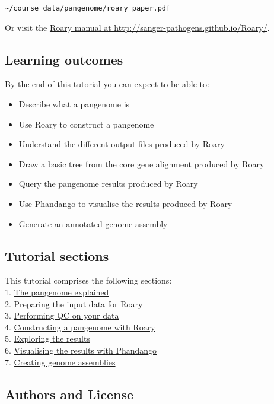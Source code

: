 \documentclass[11pt]{article}
\providecommand{\tightlist}{%
      \setlength{\itemsep}{0pt}\setlength{\parskip}{0pt}}
\begin{document}
\texttt{\textasciitilde{}/course\_data/pangenome/roary\_paper.pdf}

Or visit the \href{http://sanger-pathogens.github.io/Roary/}{Roary
manual at http://sanger-pathogens.github.io/Roary/}.

\hypertarget{learning-outcomes}{%
\subsection{Learning outcomes}\label{learning-outcomes}}

By the end of this tutorial you can expect to be able to:

\begin{itemize}
\tightlist
\item
  Describe what a pangenome is
\item
  Use Roary to construct a pangenome
\item
  Understand the different output files produced by Roary
\item
  Draw a basic tree from the core gene alignment produced by Roary
\item
  Query the pangenome results produced by Roary
\item
  Use Phandango to visualise the results produced by Roary
\item
  Generate an annotated genome assembly
\end{itemize}

\hypertarget{tutorial-sections}{%
\subsection{Tutorial sections}\label{tutorial-sections}}

This tutorial comprises the following sections:\\
1. \href{pan_genome.ipynb}{The pangenome explained}\\
2. \href{prepare_data.ipynb}{Preparing the input data for Roary}\\
3. \href{qc.ipynb}{Performing QC on your data}\\
4. \href{run_roary.ipynb}{Constructing a pangenome with Roary}\\
5. \href{results.ipynb}{Exploring the results}\\
6. \href{phandango.ipynb}{Visualising the results with Phandango}\\
7. \href{assembly.ipynb}{Creating genome assemblies}

\hypertarget{authors-and-license}{%
\subsection{Authors and License}\label{authors-and-license}}
\end{document}

